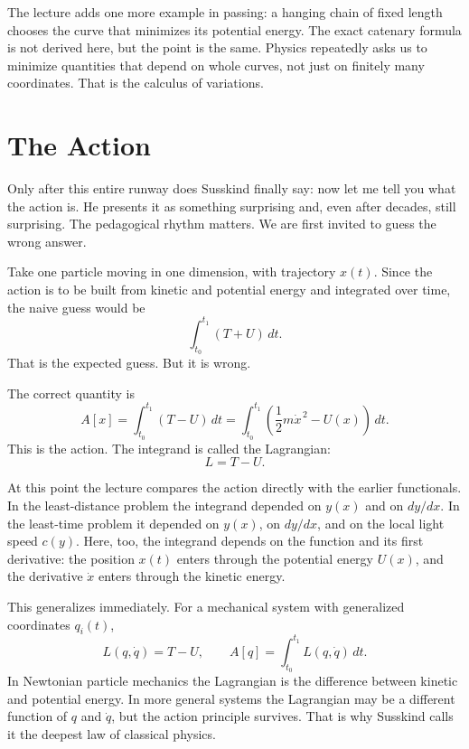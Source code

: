 The lecture adds one more example in passing: a hanging chain of fixed length chooses the curve that minimizes its potential energy. The exact catenary formula is not derived here, but the point is the same. Physics repeatedly asks us to minimize quantities that depend on whole curves, not just on finitely many coordinates. That is the calculus of variations.

\section{The Action}

Only after this entire runway does Susskind finally say: now let me tell you what the action is. He presents it as something surprising and, even after decades, still surprising. The pedagogical rhythm matters. We are first invited to guess the wrong answer.

Take one particle moving in one dimension, with trajectory \(x(t)\). Since the action is to be built from kinetic and potential energy and integrated over time, the naive guess would be
\begin{equation}
\int_{t_0}^{t_1} (T+U)\,dt.
\end{equation}
That is the expected guess. But it is wrong.

The correct quantity is
\begin{equation}
A[x]
=
\int_{t_0}^{t_1}(T-U)\,dt
=
\int_{t_0}^{t_1}
\left(
\frac12 m\dot x^{\,2}-U(x)
\right)\,dt.
\end{equation}
This is the action. The integrand is called the Lagrangian:
\begin{equation}
L=T-U.
\end{equation}

At this point the lecture compares the action directly with the earlier functionals. In the least-distance problem the integrand depended on \(y(x)\) and on \(dy/dx\). In the least-time problem it depended on \(y(x)\), on \(dy/dx\), and on the local light speed \(c(y)\). Here, too, the integrand depends on the function and its first derivative: the position \(x(t)\) enters through the potential energy \(U(x)\), and the derivative \(\dot x\) enters through the kinetic energy.

This generalizes immediately. For a mechanical system with generalized coordinates \(q_i(t)\),
\begin{equation}
L(q,\dot q)=T-U,
\qquad
A[q]=\int_{t_0}^{t_1}L(q,\dot q)\,dt.
\end{equation}
In Newtonian particle mechanics the Lagrangian is the difference between kinetic and potential energy. In more general systems the Lagrangian may be a different function of \(q\) and \(\dot q\), but the action principle survives. That is why Susskind calls it the deepest law of classical physics.

